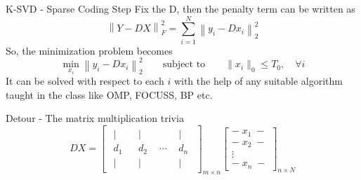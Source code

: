 \documentclass{beamer}
\begin{document}
\begin{frame}{K-SVD - Sparse Coding Step}
    Fix the D, then the penalty term can be written as
    \[
    \left\|Y - DX \right\|_F^2 = \sum_{i=1}^{N}\left\|y_i - Dx_i \right\|_2^2
    \]
    So, the minimization problem becomes
    \[
    \min_{x_i} \left\| y_i - D x_i \right\|_2^2
    \qquad
    \text{subject to}
    \qquad
    \|x_i\|_0 \leq T_0,
    \quad \forall i
    \]
    It can be solved with respect to each $i$ with the help of any suitable
    algorithm taught in the class like OMP, FOCUSS, BP etc.
\end{frame}

\begin{frame}{Detour - The matrix multiplication trivia}
    \[
    DX=
    \left[
    \begin{array}{cccc}
    \begin{array}{c}|\\ d_1\\ |\end{array} &
    \begin{array}{c}|\\ d_2\\ |\end{array} &
    \cdots &
    \begin{array}{c}|\\ d_n\\ |\end{array}
    \end{array}
    \right]_{m\times n}
    \left[
    \begin{array}{c}
    {-}\;x_1\;{-} \\
    {-}\;x_2\;{-} \\
    \vdots \\
    {-}\;x_n\;{-}
    \end{array}
    \right]_{n\times N}
    \]
    \[
    \phantom{\equiv \left[\begin{array}{c}d_1x_1\end{array}\right]_{m\times N}}
    \]
\end{frame}
\end{document}
